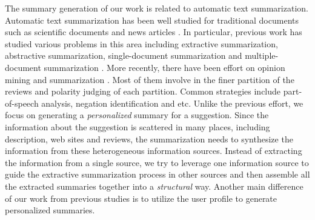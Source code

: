 The summary generation of our work is related to automatic text 
summarization. 
Automatic text summarization has been well studied for traditional 
documents such as scientific documents and news articles \cite{Radev:02}. 
In particular, previous work has studied various problems in this 
area including extractive summarization, abstractive summarization, 
single-document summarization and multiple-document summarization \cite{Das:07}. 
More recently, there have been effort on opinion mining and 
summarization \cite{Pang:2008:OMS:1454711.1454712,
Pak10, Pang:2004:SES:1218955.1218990,
mani1999advances,mani2001automatic,knight2002summarization,
ding2007utility,BACCIANELLA10.769,Chen:2010:AOM:1829879.1829923,
dey2009opinion,journals/sigir/Esuli08}. Most of them involve in the 
finer partition of the reviews and polarity judging of each partition. 
Common strategies include part-of-speech analysis, negation 
identification and etc. 
Unlike the previous effort, we focus on generating a 
{\em personalized} summary for a suggestion. 
Since the information about the suggestion is scattered in 
many places, including description, web sites 
and reviews, the summarization needs to synthesize the information 
from these heterogeneous information sources. Instead of 
extracting the information from a single source, we try to 
leverage one information source to guide the extractive 
summarization process in other sources and then assemble
all the extracted summaries together into a {\em structural} way.  
Another main difference
of our work from previous studies is to utilize the user profile 
to generate personalized summaries.  

